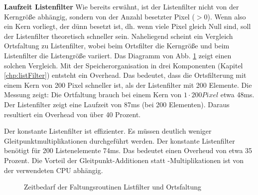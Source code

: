 \documentclass[a4paper,12pt]{article}
\begin{document}
 
\textbf{Laufzeit Listenfilter}
Wie bereits erwähnt, ist der Listenfilter nicht von der Kerngröße abhängig,
sondern von der Anzahl besetzter Pixel ($>0$). Wenn also ein Kern vorliegt, der
dünn besetzt ist, dh. wenn viele Pixel gleich Null sind, soll der Listenfilter
theoretisch schneller sein. Naheliegend scheint ein Vergleich Ortsfaltung zu
Listenfilter, wobei beim Ortsfilter die Kerngröße und beim Listenfilter die Listengröße
variiert. Das Diagramm von Abb. \ref{figure__list_vs_convolve} zeigt einen
solchen Vergleich.
Mit der Speicherorganisation in drei Komponenten (Kapitel \ref{chp:listFilter})
entsteht ein Overhead. Das bedeutet, dass die Ortsfilterung mit einem Kern von
200 Pixel schneller ist, als der Listenfilter mit 200 Elemente. Die Messung
zeigt: Die Ortfaltung brauch bei einem Kern von $1 \cdot 200 Pixel$ etwa 48ms.
Der Listenfilter zeigt eine Laufzeit von 87ms (bei 200 Elementen). Daraus
resultiert ein Overhead von über 40 Prozent. 

Der konstante Listenfilter ist effizienter. Es müssen deutlich weniger
Gleitpunktmultiplikationen durchgeführt werden. Der konstante Listenfilter
benötigt für 200 Listenelemente 74ms. Das bedeutet einen Overheud von etwa 35
Prozent. Die Vorteil der Gleitpunkt-Additionen statt -Multiplikationen ist von
der verwendeten CPU abhängig.\\

  

\begin{figure}[htbp]
\caption{Zeitbedarf der Faltungsroutinen Listfilter und Ortsfaltung}%
\label{figure__list_vs_convolve}
\end{figure}
\end{document}
